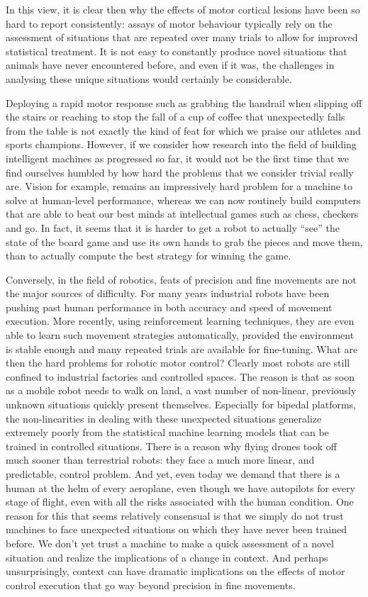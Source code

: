 In this view, it is clear then why the effects of motor cortical lesions have been so hard to report consistently: assays of motor behaviour typically rely on the assessment of situations that are repeated over many trials to allow for improved statistical treatment. It is not easy to constantly produce novel situations that animals have never encountered before, and even if it was, the challenges in analysing these unique situations would certainly be considerable.

Deploying a rapid motor response such as grabbing the handrail when slipping off the stairs or reaching to stop the fall of a cup of coffee that unexpectedly falls from the table is not exactly the kind of feat for which we praise our athletes and sports champions. However, if we consider how research into the field of building intelligent machines as progressed so far, it would not be the first time that we find ourselves humbled by how hard the problems that we consider trivial really are. Vision for example, remains an impressively hard problem for a machine to solve at human-level performance, whereas we can now routinely build computers that are able to beat our best minds at intellectual games such as chess, checkers and go. In fact, it seems that it is harder to get a robot to actually ``see'' the state of the board game and use its own hands to grab the pieces and move them, than to actually compute the best strategy for winning the game.

Conversely, in the field of robotics, feats of precision and fine movements are not the major sources of difficulty. For many years industrial robots have been pushing past human performance in both accuracy and speed of movement execution. More recently, using reinforcement learning techniques, they are even able to learn such movement strategies automatically, provided the environment is stable enough and many repeated trials are available for fine-tuning. What are then the hard problems for robotic motor control? Clearly most robots are still confined to industrial factories and controlled spaces. The reason is that as soon as a mobile robot needs to walk on land, a vast number of non-linear, previously unknown situations quickly present themselves. Especially for bipedal platforms, the non-linearities in dealing with these unexpected situations generalize extremely poorly from the statistical machine learning models that can be trained in controlled situations. There is a reason why flying drones took off much sooner than terrestrial robots: they face a much more linear, and predictable, control problem. And yet, even today we demand that there is a human at the helm of every aeroplane, even though we have autopilots for every stage of flight, even with all the risks associated with the human condition. One reason for this that seems relatively consensual is that we simply do not trust machines to face unexpected situations on which they have never been trained before. We don't yet trust a machine to make a quick assessment of a novel situation and realize the implications of a change in context. And perhaps unsurprisingly, context can have dramatic implications on the effects of motor control execution that go way beyond precision in fine movements.

